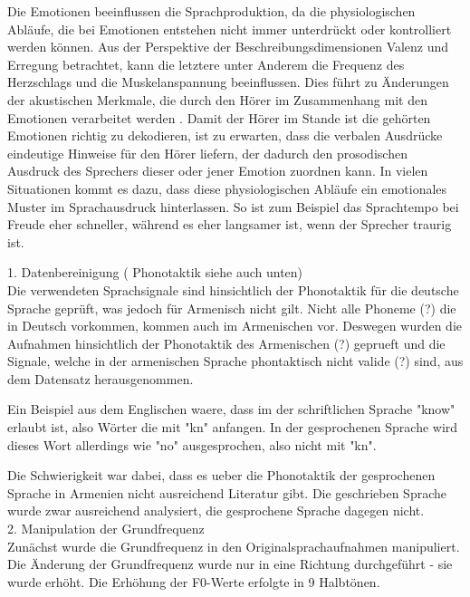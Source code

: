 \documentclass[11pt,a4paper,headsepline,twoside,toc=bibliography]{scrreprt}
\begin{document}
Die Emotionen beeinflussen die Sprachproduktion, da die physiologischen Abläufe, die bei Emotionen entstehen nicht immer unterdrückt oder kontrolliert werden können. Aus der Perspektive der Beschreibungsdimensionen Valenz und Erregung betrachtet, kann die letztere unter Anderem die Frequenz des Herzschlags und die Muskelanspannung beeinflussen. Dies führt zu Änderungen der akustischen Merkmale, die durch den Hörer im Zusammenhang mit den Emotionen verarbeitet werden \parencite{Schirmer2016a}. Damit der Hörer im Stande ist die gehörten Emotionen richtig zu dekodieren, ist zu erwarten, dass die verbalen Ausdrücke eindeutige Hinweise für den Hörer liefern, der dadurch den prosodischen Ausdruck des Sprechers dieser oder jener Emotion zuordnen kann.  In vielen Situationen kommt es dazu, dass diese physiologischen Abläufe ein emotionales Muster im Sprachausdruck hinterlassen. So ist zum Beispiel das Sprachtempo bei Freude eher schneller, während es eher langsamer ist, wenn der Sprecher traurig ist. 
 



1. Datenbereinigung ( Phonotaktik siehe auch unten)\\

Die verwendeten Sprachsignale sind hinsichtlich der Phonotaktik für die deutsche Sprache geprüft, was jedoch für Armenisch nicht gilt.
Nicht alle Phoneme (?) die in Deutsch vorkommen, kommen auch im Armenischen vor.
Deswegen wurden die Aufnahmen hinsichtlich der Phonotaktik des Armenischen (?) geprueft und die Signale, welche in der armenischen Sprache phontaktisch nicht valide (?) sind, aus dem Datensatz herausgenommen. 

Ein Beispiel aus dem Englischen waere, dass im
der schriftlichen Sprache "know" erlaubt ist, also Wörter die mit "kn" anfangen.
In der gesprochenen Sprache wird dieses Wort allerdings wie "no" ausgesprochen, also nicht mit "kn".

Die Schwierigkeit war dabei, dass es ueber die Phonotaktik der gesprochenen Sprache in Armenien nicht ausreichend Literatur gibt. Die geschrieben Sprache wurde zwar ausreichend analysiert, die
gesprochene Sprache dagegen nicht. \\



2. Manipulation der Grundfrequenz\\

Zunächst wurde die Grundfrequenz in den Originalsprachaufnahmen manipuliert. 
Die Änderung der Grundfrequenz wurde nur in eine Richtung durchgeführt - sie wurde erhöht. 
Die Erhöhung der F0-Werte erfolgte in 9 Halbtönen. \\
\end{document}
